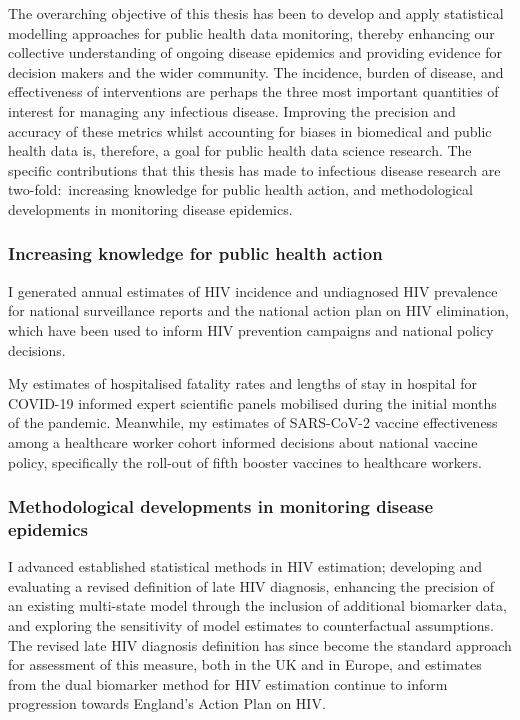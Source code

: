 
\begin{impact}

    The overarching objective of this thesis has been to develop and apply statistical modelling approaches for public health data monitoring, thereby enhancing our collective understanding of ongoing disease epidemics and providing evidence for decision makers and the wider community. The incidence, burden of disease, and effectiveness of interventions are perhaps the three most important quantities of interest for managing any infectious disease. Improving the precision and accuracy of these metrics whilst accounting for biases in biomedical and public health data is, therefore, a goal for public health data science research. The specific contributions that this thesis has made to infectious disease research are two-fold:\ increasing knowledge for public health action, and methodological developments in monitoring disease epidemics.

    \subsubsection*{Increasing knowledge for public health action}

    I generated annual estimates of HIV incidence and undiagnosed HIV prevalence for national surveillance reports and the national action plan on HIV elimination, which have been used to inform HIV prevention campaigns and national policy decisions.

    My estimates of hospitalised fatality rates and lengths of stay in hospital for COVID-19 informed expert scientific panels mobilised during the initial months of the pandemic. Meanwhile, my estimates of SARS-CoV-2 vaccine effectiveness among a healthcare worker cohort informed decisions about national vaccine policy, specifically the roll-out of fifth booster vaccines to healthcare workers.

    \subsubsection*{Methodological developments in monitoring disease epidemics}

    I advanced established statistical methods in HIV estimation; developing and evaluating a revised definition of late HIV diagnosis, enhancing the precision of an existing multi-state model through the inclusion of additional biomarker data, and exploring the sensitivity of model estimates to counterfactual assumptions. The revised late HIV diagnosis definition has since become the standard approach for assessment of this measure, both in the UK and in Europe, and estimates from the dual biomarker method for HIV estimation continue to inform progression towards England's Action Plan on HIV\@.


\end{impact}
